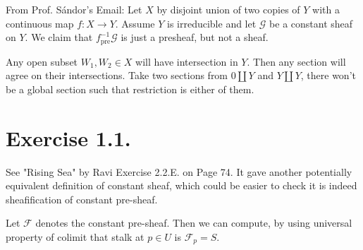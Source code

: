 From Prof. S\'andor's Email: Let $X$ by disjoint union of two copies of $Y$ with a continuous map $f:X\to Y$. Assume $Y$ is irreducible and let $\mathscr G$ be a constant sheaf on $Y$. We claim that $f^{-1}_{\text{pre}} \mathscr G$ is just a presheaf, but not a sheaf. 

Any open subset $W_1, W_2\in X$ will have intersection in $Y$. Then any section will agree on their intersections. Take two sections from $0\amalg Y$ and $Y\amalg Y$, there won't be a global section such that restriction is either of them.

\section{Exercise 1.1.}

See "Rising Sea" by Ravi Exercise 2.2.E. on Page 74. It gave another potentially equivalent definition of constant sheaf, which could be easier to check it is indeed sheafification of constant pre-sheaf.

Let $\mathscr F$ denotes the constant pre-sheaf. Then we can compute, by using universal property of colimit that stalk at $p\in U$ is $\mathscr F_p=S$. 


